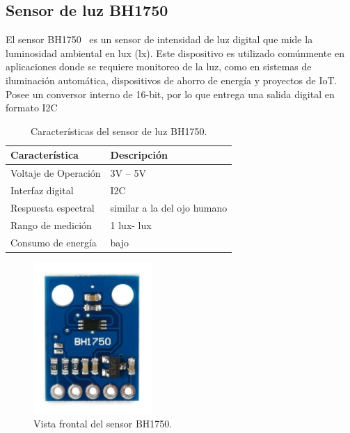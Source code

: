 \pagebreak

\subsection{Sensor de luz BH1750}

El sensor BH1750~\cite{manual:BH1750} es un sensor de intensidad de luz digital que mide la luminosidad ambiental en lux (lx). Este dispositivo es utilizado comúnmente en aplicaciones donde se requiere monitoreo de la luz, como en sistemas de iluminación automática, dispositivos de ahorro de energía y proyectos de IoT.
Posee un conversor interno de 16-bit, por lo que entrega una salida digital en formato I2C

\begin{table}[htbp]
\begin{center}
\caption{Características del sensor de luz BH1750.}
\begin{tabular}{|l|l|}
\hline
\rowcolor[HTML]{C0C0C0} 
\textbf{Característica} & \textbf{Descripción}\\ \hline
Voltaje de Operación &  3V – 5V \\ \hline
Interfaz digital & I2C \\ \hline
Respuesta espectral & similar a la del ojo humano \\ \hline
Rango de medición & 1 lux\quad-\quad65535 lux \\ \hline
Consumo de energía & bajo \\ \hline
\end{tabular}
\end{center}
\end{table}

\begin{figure}[h]
    \centering
    \includegraphics[width=0.4\textwidth]{img/herramientas/bh1750_cara.png}
    \caption{Vista frontal del sensor BH1750.}
\end{figure}
\pagebreak

